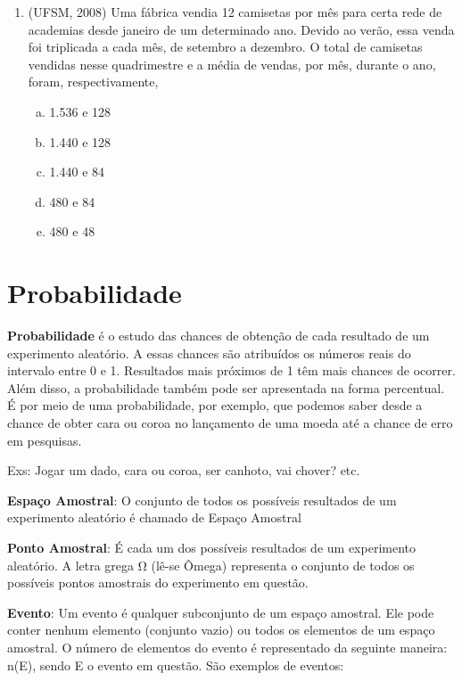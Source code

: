 \begin{multicols*}{2}
\begin{enumerate}[wide, labelwidth=!, labelindent=0pt]
		\item (UFSM, 2008) Uma fábrica vendia 12 camisetas por mês para certa rede de academias desde janeiro de um determinado ano. Devido ao verão, essa venda foi triplicada a cada mês, de setembro a dezembro. O total de camisetas vendidas nesse quadrimestre e a média de vendas, por mês, durante o ano, foram, respectivamente,
		\begin{enumerate}[(a)]
			\item 1.536 e 128
			\item 1.440 e 128
			\item 1.440 e 84
			\item 480 e 84
			\item 480 e 48
		\end{enumerate}



	\end{enumerate}

	
	\pagebreak
	\section*{Probabilidade}

	\textbf{Probabilidade} é o estudo das chances de obtenção de cada resultado de um experimento aleatório. A essas chances são atribuídos os números reais do intervalo entre 0 e 1. Resultados mais próximos de 1 têm mais chances de ocorrer. Além disso, a probabilidade também pode ser apresentada na forma percentual. É por meio de uma probabilidade, por exemplo, que podemos saber desde a chance de obter cara ou coroa no lançamento de uma moeda até a chance de erro em pesquisas.

	Exs: Jogar um dado, cara ou coroa, ser canhoto, vai chover? etc.

	\textbf{Espaço Amostral}: O conjunto de todos os possíveis resultados de um experimento aleatório é chamado de Espaço Amostral

	\textbf{Ponto Amostral}: É cada um dos possíveis resultados de um experimento aleatório.
	A letra grega Ω (lê-se Ômega) representa o conjunto de todos os possíveis pontos amostrais do experimento em questão.

	\textbf{Evento}: Um evento é qualquer subconjunto de um espaço amostral. Ele pode conter nenhum elemento (conjunto vazio) ou todos os elementos de um espaço amostral. O número de elementos do evento é representado da seguinte maneira: n(E), sendo E o evento em questão. São exemplos de eventos:


\end{multicols*}
